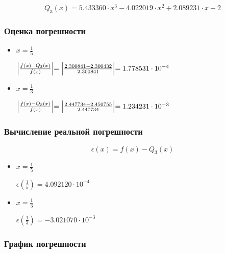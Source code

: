 \begin{displaymath}
Q_3(x) = 5.433360 \cdot x^3 - 4.022019 \cdot x^2 + 2.089231 \cdot x+2
\end{displaymath}

\subsubsection{Оценка погрешности}

\begin{itemize}

\item $x = \frac{1}{5}$

$\Bigl | \frac{f(x) - Q_3(x)}{f(x)} \Bigl | = \Bigl | \frac{2.300841 - 2.300432}{2.300841} \Bigl | = 1.778531 \cdot 10^{-4}$

\item $x = \frac{1}{3}$

$\Bigl | \frac{f(x) - Q_3(x)}{f(x)} \Bigl | = \Bigl | \frac{2.447734 - 2.450755}{2.447734} \Bigl | = 1.234231 \cdot 10^{-3}$

\end{itemize}

\subsubsection{Вычисление реальной погрешности}

\begin{displaymath}
\epsilon(x) = f(x) - Q_3(x)
\end{displaymath}

\begin{itemize}

\item $x = \frac{1}{5}$

$\epsilon(\frac{1}{5}) = 4.092120 \cdot 10^{-4}$

\item $x = \frac{1}{3}$

$\epsilon(\frac{1}{3}) = -3.021070 \cdot 10^{-3}$

\end{itemize}

\subsubsection{График погрешности}

